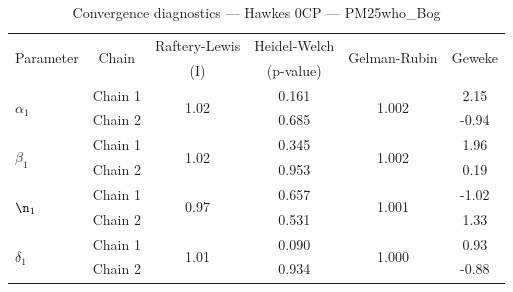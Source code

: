 \begin{table}[H]
\centering
\caption{Convergence diagnostics — Hawkes 0CP — PM25who_Bog}
\begin{tabular}{lccccc}
\toprule
\multirow{2}{*}{Parameter} & \multirow{2}{*}{Chain} & Raftery-Lewis & Heidel-Welch & \multirow{2}{*}{Gelman-Rubin} & \multirow{2}{*}{Geweke} \\
 & & (I) & (p-value) & & (z) \\
\midrule
\multirow{2}{*}{$\alpha_1$} & Chain 1 & \multirow{2}{*}{1.02} & 0.161 & \multirow{2}{*}{1.002} & 2.15 \\
 & Chain 2 & & 0.685 & & -0.94 \\
\midrule
\multirow{2}{*}{$\beta_1$} & Chain 1 & \multirow{2}{*}{1.02} & 0.345 & \multirow{2}{*}{1.002} & 1.96 \\
 & Chain 2 & & 0.953 & & 0.19 \\
\midrule
\multirow{2}{*}{$\n_1$} & Chain 1 & \multirow{2}{*}{0.97} & 0.657 & \multirow{2}{*}{1.001} & -1.02 \\
 & Chain 2 & & 0.531 & & 1.33 \\
\midrule
\multirow{2}{*}{$\delta_1$} & Chain 1 & \multirow{2}{*}{1.01} & 0.090 & \multirow{2}{*}{1.000} & 0.93 \\
 & Chain 2 & & 0.934 & & -0.88 \\
\bottomrule
\end{tabular}
\end{table}
